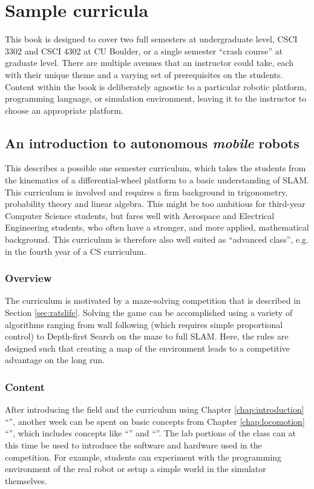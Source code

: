 \chapter{Sample curricula}

This book is designed to cover two full semesters at undergraduate level, CSCI 3302 and CSCI 4302 at CU Boulder, or a single semester ``crash course'' at graduate level. There are multiple avenues that an instructor could take, each with their unique theme and a varying set of prerequisites on the students. Content within the book is deliberately agnostic to a particular robotic platform, programming language, or simulation environment, leaving it to the instructor to choose an appropriate platform.


\section{An introduction to autonomous \emph{mobile} robots}
This describes a possible one semester curriculum, which takes the students from the kinematics of a differential-wheel platform to a basic understanding of SLAM. This curriculum is involved and requires a firm background in trigonometry, probability theory and linear algebra. This might be too ambitious for third-year Computer Science students, but fares well with Aerospace and Electrical Engineering students, who often have a stronger, and more applied, mathematical background. This curriculum is therefore also well suited as ``advanced class'', e.g. in the fourth year of a CS curriculum.

\subsection{Overview}
The curriculum is motivated by a maze-solving competition that is described in Section \ref{sec:ratslife}. Solving the game can be accomplished using a variety of algorithms ranging from wall following (which requires simple proportional control) to Depth-first Search on the maze to full SLAM. Here, the rules are designed such that creating a map of the environment leads to a competitive advantage on the long run.

\subsection{Content}\label{sec:curr1content}
After introducing the field and the curriculum using Chapter \ref{chap:introduction} ``'', another week can be spent on basic concepts from Chapter \ref{chap:locomotion} ``'', which includes concepts like ``'' and ``''. The lab portions of the class can at this time be used to introduce the software and hardware used in the competition. For example, students can experiment with the programming environment of the real robot or setup a simple world in the simulator themselves.

